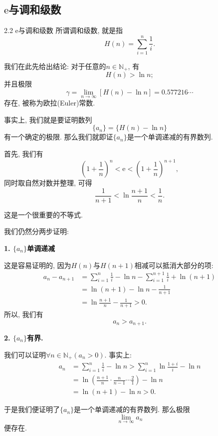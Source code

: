 \documentclass[serif]{beamer}
\begin{document}
\subsection{\kaishu $\mathrm{e}$与调和级数}

\begin{frame}{2.2 $\mathrm{e}$与调和级数}
	所谓调和级数, 就是指
	\[H(n)=\sum\limits_{i=1}^n{\frac{1}{i}}.\]\par
	我们在此先给出结论: 对于任意的$n\in\mathbb{N}_+$, 有
	\[H(n)>\ln{n};\]
	并且极限
	\[\gamma=\lim\limits_{n\to\infty}[H(n)-\ln{n}]=0.577216\cdots\]
	存在, 被称为欧拉(Euler)常数.
\end{frame}

\begin{frame}
	事实上, 我们就是要证明数列
	\[\{a_n\}=\{H(n)-\ln{n}\}\]
	有一个确定的极限. 那么我们就即证$\{a_n\}$是一个单调递减的有界数列.\par
	首先, 我们有
	\[\left(1+\frac{1}{n}\right)^n<\mathrm{e}<\left(1+\frac{1}{n}\right)^{n+1},\]
	同时取自然对数并整理, 可得
	\[\frac{1}{n+1}<\ln{\frac{n+1}{n}}<\frac{1}{n}.\]\par
	这是一个很重要的不等式.
\end{frame}

\begin{frame}
	我们仍然分两步证明:\par
	\textbf{1. $\{a_n\}$单调递减}\par
	这是容易证明的, 因为$H(n)$与$H(n+1)$相减可以抵消大部分的项:
	\begin{align*}
		a_n-a_{n+1}&=\sum\limits_{i=1}^{n}{\frac{1}{i}}-\ln{n}-\sum\limits_{i=1}^{n+1}{\frac{1}{i}}+\ln{(n+1)}\\
		&=\ln{(n+1)}-\ln{n}-\frac{1}{n+1}\\
		&=\ln{\frac{n+1}{n}}-\frac{1}{n+1}>0.
	\end{align*}
	所以, 我们有
	\[a_n>a_{n+1}.\]
\end{frame}

\begin{frame}
	\textbf{2. $\{a_n\}$有界.}\par
	我们可以证明$\forall n\in\mathbb{N}_+(a_n>0)$. 事实上:
	\begin{align*}
		a_n&=\sum\limits_{i=1}^{n}{\frac{1}{i}}-\ln{n}>\sum\limits_{i=1}^{n}{\ln{\frac{1+i}{i}}}-\ln{n}\\
		&=\ln{\left(\frac{n+1}{n}\cdot\frac{n}{n-1}\cdots\frac{2}{1}\right)}-\ln{n}\\
		&=\ln{(n+1)}-\ln{n}>0.
	\end{align*}\par
	于是我们便证明了$\{a_n\}$是一个单调递减的有界数列. 那么极限
	\[\lim\limits_{n\to\infty}a_n\]
	便存在.
\end{frame}
\end{document}
